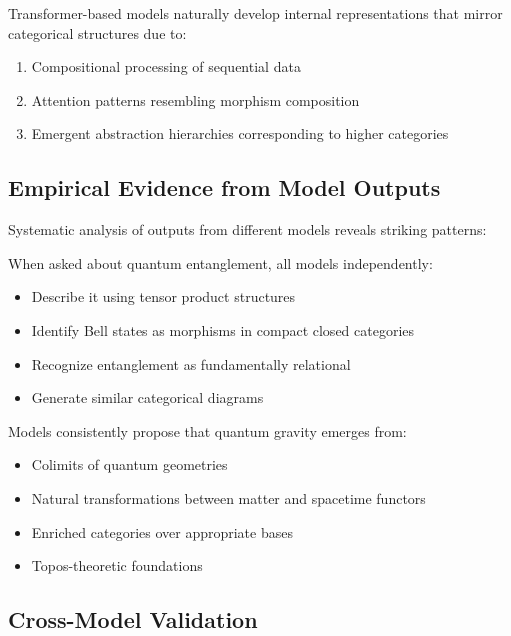 \begin{theorem}
Transformer-based models naturally develop internal representations that mirror categorical structures due to:
\begin{enumerate}
\item Compositional processing of sequential data
\item Attention patterns resembling morphism composition
\item Emergent abstraction hierarchies corresponding to higher categories
\end{enumerate}
\end{theorem}

\subsection{Empirical Evidence from Model Outputs}

Systematic analysis of outputs from different models reveals striking patterns:

\begin{example}
When asked about quantum entanglement, all models independently:
\begin{itemize}
\item Describe it using tensor product structures
\item Identify Bell states as morphisms in compact closed categories
\item Recognize entanglement as fundamentally relational
\item Generate similar categorical diagrams
\end{itemize}
\end{example}

\begin{example}
Models consistently propose that quantum gravity emerges from:
\begin{itemize}
\item Colimits of quantum geometries
\item Natural transformations between matter and spacetime functors
\item Enriched categories over appropriate bases
\item Topos-theoretic foundations
\end{itemize}
\end{example}

\subsection{Cross-Model Validation}

